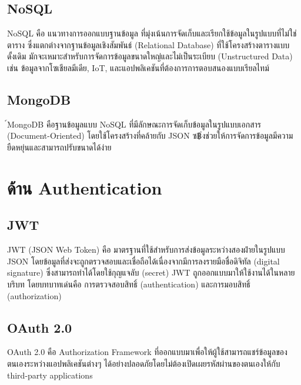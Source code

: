 \subsection{NoSQL}
NoSQL คือ แนวทางการออกแบบฐานข้อมูล ที่มุ่งเน้นการจัดเก็บและเรียกใช้ข้อมูลในรูปแบบที่ไม่ใช่ตาราง ซึ่งแตกต่างจากฐานข้อมูลเชิงสัมพันธ์ (Relational Database) ที่ใช้โครงสร้างตารางแบบดั้งเดิม
มักจะเหมาะสำหรับการจัดการข้อมูลขนาดใหญ่และไม่เป็นระเบียบ (Unstructured Data) เช่น ข้อมูลจากโซเชียลมีเดีย, IoT, และแอปพลิเคชันที่ต้องการการตอบสนองแบบเรียลไทม์ \cite{nosql}
\subsection{MongoDB}
์MongoDB คือฐานข้อมูลแบบ NoSQL ที่มีลักษณะการจัดเก็บข้อมูลในรูปแบบเอกสาร (Document-Oriented) โดยใช้โครงสร้างที่คล้ายกับ JSON ซ฿่งช่วยให้การจัดการข้อมูลมีความยืดหยุ่นและสามารถปรับขนาดได้ง่าย \cite{mongodb}

\section{ด้าน Authentication}
\subsection{JWT}
JWT (JSON Web Token) คือ มาตรฐานที่ใช้สำหรับการส่งข้อมูลระหว่างสองฝ่ายในรูปแบบ JSON โดยข้อมูลที่ส่งจะถูกตรวจสอบและเชื่อถือได้เนื่องจากมีการลงรายมือชื่อดิจิทัล (digital signature) ซึ่งสามารถทำได้โดยใช้กุญแจลับ (secret)
JWT ถูกออกแบบมาให้ใช้งานได้ในหลายบริบท โดยบทบาทเด่นคือ การตรวจสอบสิทธิ์ (authentication) และการมอบสิทธิ์ (authorization) \cite{jwt1}\cite{jwt2}
\subsection{OAuth 2.0}
OAuth 2.0 คือ Authorization Framework ที่ออกแบบมาเพื่อให้ผู้ใช้สามารถแชร์ข้อมูลของตนเองระหว่างแอปพลิเคชันต่างๆ ได้อย่างปลอดภัยโดยไม่ต้องเปิดเผยรหัสผ่านของตนเองให้กับ third-party applications \cite{oauth1}\cite{oauth2}



